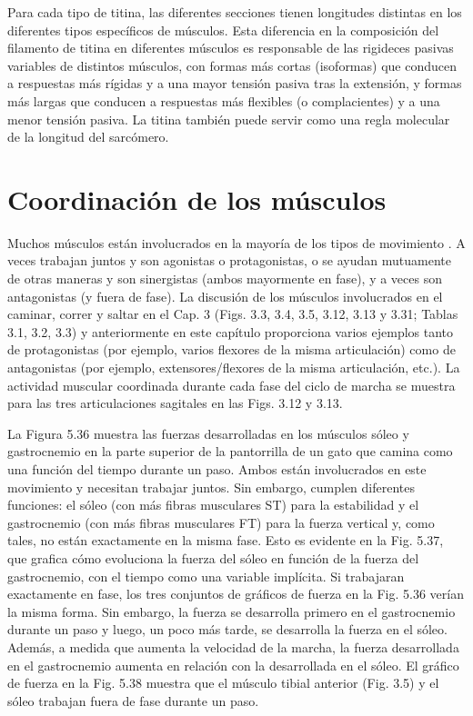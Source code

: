 \documentclass[12pt]{book}
\begin{document}
Para cada tipo de titina, las diferentes secciones tienen longitudes distintas en los diferentes tipos específicos de músculos. Esta diferencia en la composición del filamento de titina en diferentes músculos es responsable de las rigideces pasivas variables de distintos músculos, con formas más cortas (isoformas) que conducen a respuestas más rígidas y a una mayor tensión pasiva tras la extensión, y formas más largas que conducen a respuestas más flexibles (o complacientes) y a una menor tensión pasiva. La titina también puede servir como una regla molecular de la longitud del sarcómero.

\section{Coordinación de los músculos}

Muchos músculos están involucrados en la mayoría de los tipos de movimiento \cite{28, 29, 30}. A veces trabajan juntos y son agonistas o protagonistas, o se ayudan mutuamente de otras maneras y son sinergistas (ambos mayormente en fase), y a veces son antagonistas (y fuera de fase). La discusión de los músculos involucrados en el caminar, correr y saltar en el Cap. 3 (Figs. 3.3, 3.4, 3.5, 3.12, 3.13 y 3.31; Tablas 3.1, 3.2, 3.3) y anteriormente en este capítulo proporciona varios ejemplos tanto de protagonistas (por ejemplo, varios flexores de la misma articulación) como de antagonistas (por ejemplo, extensores/flexores de la misma articulación, etc.). La actividad muscular coordinada durante cada fase del ciclo de marcha se muestra para las tres articulaciones sagitales en las Figs. 3.12 y 3.13.

La Figura 5.36 muestra las fuerzas desarrolladas en los músculos sóleo y gastrocnemio en la parte superior de la pantorrilla de un gato que camina como una función del tiempo durante un paso. Ambos están involucrados en este movimiento y necesitan trabajar juntos. Sin embargo, cumplen diferentes funciones: el sóleo (con más fibras musculares ST) para la estabilidad y el gastrocnemio (con más fibras musculares FT) para la fuerza vertical y, como tales, no están exactamente en la misma fase. Esto es evidente en la Fig. 5.37, que grafica cómo evoluciona la fuerza del sóleo en función de la fuerza del gastrocnemio, con el tiempo como una variable implícita. Si trabajaran exactamente en fase, los tres conjuntos de gráficos de fuerza en la Fig. 5.36 verían la misma forma. Sin embargo, la fuerza se desarrolla primero en el gastrocnemio durante un paso y luego, un poco más tarde, se desarrolla la fuerza en el sóleo. Además, a medida que aumenta la velocidad de la marcha, la fuerza desarrollada en el gastrocnemio aumenta en relación con la desarrollada en el sóleo. El gráfico de fuerza en la Fig. 5.38 muestra que el músculo tibial anterior (Fig. 3.5) y el sóleo trabajan fuera de fase durante un paso.
\end{document}
